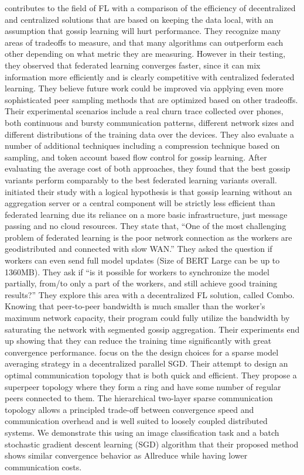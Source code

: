 \documentclass[10pt,twocolumn,letterpaper]{article}
\theoremstyle{definition}
\begin{document}
\cite{hegedHus2021decentralized} contributes to the field of FL  with a comparison of the efficiency of decentralized and centralized solutions that are based on keeping the data local, with an assumption that gossip learning will hurt performance.  They recognize many areas of tradeoffs to measure, and that many algorithms can outperform each other depending on what metric they are measuring.  However in their testing, they observed that federated learning converges faster, since it can mix information more efficiently and is clearly competitive with centralized federated learning.  They believe future work could be improved via applying even more sophisticated peer sampling methods that are optimized  based on other tradeoffs.
Their experimental scenarios include a real churn trace collected over phones, both continuous and bursty communication patterns, different network sizes and different distributions of the training data over the devices. They also evaluate a number of additional techniques including a compression technique based on sampling, and token account based flow control for gossip learning. After evaluating the average cost of both approaches, they found that the best gossip variants perform comparably to the best federated learning variants overall. %
\cite{hu2019decentralized} initiated their study with a logical hypothesis is that gossip learning without an aggregation server or a central component will be strictly less efficient than federated learning due its reliance on a more basic infrastructure, just message passing and no cloud resources.  They state that, “One of the most challenging problem of federated learning is the poor network connection as the workers are geodistributed and connected with slow WAN.”  They asked the question if workers can even send full model updates (Size of BERT Large can be up to 1360MB).  They ask if  “is it possible for workers to synchronize the model partially, from/to only a part of the workers, and still achieve good training results?” They explore this area with a decentralized FL solution, called Combo. Knowing that peer-to-peer bandwidth is much smaller than the worker’s maximum network capacity, their program could fully utilize the bandwidth by saturating the network with segmented gossip aggregation. Their experiments end up showing that they can reduce the training time significantly with great convergence performance. %
\cite{jameel2019ring} focus on the the design choices for a sparse model averaging strategy in a decentralized parallel SGD. Their attempt to design an optimal communication topology that is both quick and efficient.  They propose a superpeer topology where they form a ring and have some number of regular peers connected to them. The hierarchical two-layer sparse communication topology allows a principled trade-off between convergence speed and communication overhead and is well suited to loosely coupled distributed systems. We demonstrate this using an image classification task and a batch stochastic gradient descent learning (SGD) algorithm that their proposed method shows similar convergence behavior as Allreduce while having lower communication costs.  %
\end{document}
